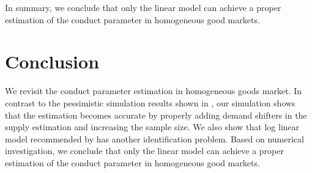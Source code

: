 \documentclass[11pt, a4paper]{article}
\begin{document}
In summary, we conclude that only the linear model can achieve a proper estimation of the conduct parameter in homogeneous good markets. 










    
\section{Conclusion}

We revisit the conduct parameter estimation in homogeneous goods market. In contrast to the pessimistic simulation results shown in \cite{perloff2012collinearity}, our simulation shows that the estimation becomes accurate by properly adding demand shifters in the supply estimation and increasing the sample size. We also show that log linear model recommended by \cite{perloff2012collinearity} has another identification problem. Based on numerical investigation, we conclude that only the linear model can achieve a proper estimation of the conduct parameter in homogeneous good markets. 




\end{document}
